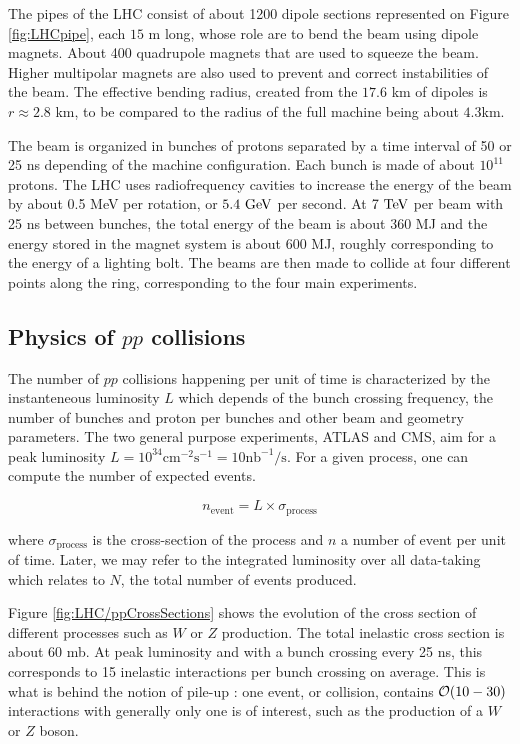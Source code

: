    The pipes of the LHC consist of about 1200 dipole sections represented on Figure
    \ref{fig:LHCpipe}, each $15$ m long, whose role are to bend the beam using dipole
    magnets. About 400 quadrupole magnets that are used to squeeze the
    beam. Higher multipolar magnets are also used to prevent and correct instabilities of
    the beam. The effective bending radius, created from the $17.6$ km of dipoles is
    $r \approx 2.8$ km, to be compared to the radius of the full machine being about $4.3$km.

    The beam is organized in bunches of protons separated by a time interval of 50 or
    25 ns depending of the machine configuration. Each bunch is made of about $10^{11}$
    protons. The LHC uses radiofrequency cavities to increase the energy of the beam by
    about 0.5 MeV per rotation, or $5.4~\text{GeV}$ per second. At $7~\text{TeV}$ per beam with 25 ns
    between bunches, the total energy of the beam is about 360 MJ and the energy stored
    in the magnet system is about 600 MJ, roughly corresponding to the energy of a
    lighting bolt. The beams are then made to collide at four different points along the
    ring, corresponding to the four main experiments.

        \subsection{Physics of $pp$ collisions \label{sec:physicsFromCollisionsAtTheLHC}}

    The number of $pp$ collisions happening per unit of time is characterized by the
    instanteneous luminosity $L$ which depends of the bunch crossing frequency, the
    number of bunches and proton per bunches and other beam and geometry parameters.
    The two general purpose experiments, ATLAS and CMS, aim for a peak luminosity
    $ L = 10^{34} \text{cm}^{-2} \text{s}^{-1} = 10 \text{nb}^{-1} / \text{s}$. For a
    given process, one can compute the number of expected events.

    $$ n_\text{event} = L \times \sigma_\text{process} $$

    where $\sigma_\text{process}$ is the cross-section of the process and $n$ a number
    of event per unit of time. Later, we may refer to the integrated luminosity over all
    data-taking which relates to $N$, the total number of events produced.

    Figure \ref{fig:LHC/ppCrossSections} shows the evolution of the cross section of different
    processes such as $W$ or $Z$ production. The total inelastic cross section is about
    60 mb. At peak luminosity and with a bunch crossing every 25 ns, this corresponds
    to 15 inelastic interactions per bunch crossing on average. This is what is behind
    the notion of pile-up : one event, or collision, contains $\mathcal{O}(10-30)$
    interactions with generally only one is of interest, such as the production of a $W$
    or $Z$ boson.

